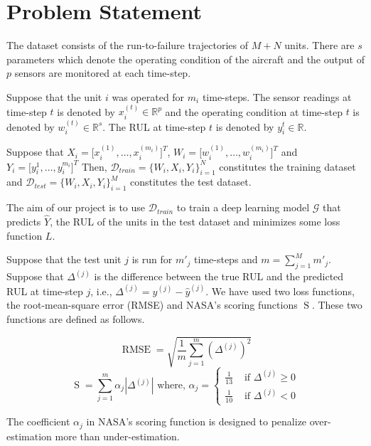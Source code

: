 \documentclass[a4paper,12pt]{article}
\DeclareMathOperator{\rmse}{RMSE}
\DeclareMathOperator{\nasa}{S}
\begin{document}

\section{Problem Statement}

The dataset consists of the run-to-failure trajectories of $M+N$ units. There
are $s$ parameters which denote the operating condition of the aircraft and the
output of $p$ sensors are monitored at each time-step.

Suppose that the unit $i$ was operated for $m_i$ time-steps. The sensor
readings at time-step $t$ is denoted by $x_{i}^{(t)} \in \mathbb{R}^{p}$ and the
operating condition at time-step $t$ is denoted by
$w_{i}^{(t)} \in \mathbb{R}^{s}$. The RUL at time-step $t$ is denoted by
$y_{i}^{t} \in \mathbb{R}$.

Suppose that $X_i = \lbrack x_{i}^{(1)}, \ldots, x_{i}^{(m_i)} \rbrack^{T}$,
$W_i = \lbrack w_{i}^{(1)}, \ldots, w_{i}^{(m_i)} \rbrack^{T}$ and
$Y_i = \lbrack y_{i}^{1}, \ldots, y_{i}^{m_i} \rbrack^{T}$ Then,
$\mathcal{D}_{train} = \{W_i, X_i, Y_i\}_{i=1}^{N}$ constitutes the training
dataset and $\mathcal{D}_{test} = \{W_i, X_i, Y_i\}_{i=1}^{M}$ constitutes the
test dataset.

The aim of our project is to use $\mathcal{D}_{train}$ to train a deep learning
model $\mathcal{G}$ that predicts $\hat{Y}$, the RUL of the units in the
test dataset and minimizes some loss function $L$.

Suppose that the test unit $j$ is run for $m'_{j}$ time-steps and
$m = \sum_{j=1}^{M} m'_{j}$. Suppose that $\Delta^{(j)}$ is the difference
between the true RUL and the predicted RUL at time-step $j$, i.e.,
$\Delta^{(j)} = y^{(j)} - \hat{y}^{(j)}$. We have used two loss functions, the
root-mean-square error (RMSE) and NASA's scoring functions $\nasa$. These two
functions are defined as follows.

\[ \rmse = \sqrt{\frac{1}{m}\sum_{j=1}^{m}(\Delta^{(j)})^2} \]
\[ \nasa = \sum_{j=1}^{m}\alpha_{j}|\Delta^{(j)}| \mbox{ where, } \alpha_{j} = 
\left\{ \begin{array}{ll}
\frac{1}{13} & \mbox{ if } \Delta^{(j)} \geq 0 \\
\frac{1}{10} & \mbox{ if } \Delta^{(j)} < 0 \end{array} \right.\]

The coefficient $\alpha_{j}$ in NASA's scoring function is designed to
penalize over-estimation more than under-estimation.



\end{document}
